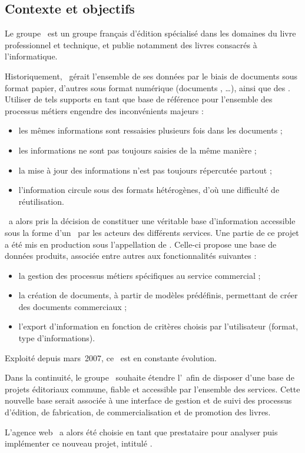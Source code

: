 \subsection{Contexte et objectifs}
\label{section:eyrolles_contexte}

Le groupe \aey\ est un groupe français d'édition spécialisé dans les domaines du livre professionnel et technique, et publie notamment des livres consacrés à l'informatique.

Historiquement, \aey\ gérait l'ensemble de ses données par le biais de documents sous format papier, d'autres sous format numérique (documents \amsword, \amsexcel\dots), ainsi que des \aemails. Utiliser de tels supports en tant que base de référence pour l'ensemble des processus métiers engendre des inconvénients majeurs :

\begin{itemize}
	\item les mêmes informations sont ressaisies plusieurs fois dans les documents ;
	\item les informations ne sont pas toujours saisies de la même manière ;
	\item la mise à jour des informations n'est pas toujours répercutée partout ;
	\item l'information circule sous des formats hétérogènes, d'où une difficulté de réutilisation.
\end{itemize}

\aey\ a alors pris la décision de constituer une véritable base d'information accessible sous la forme d'un \aintranet\ par les acteurs des différents services. Une partie de ce projet a été mis en production sous l'appellation de \emph{\alotun}. Celle-ci propose une base de données produits, associée entre autres aux fonctionnalités suivantes :

\begin{itemize}
	\item la gestion des processus métiers spécifiques au service commercial ;
	\item la création de documents, à partir de modèles prédéfinis, permettant de créer des documents commerciaux ;
	\item l'export d'information en fonction de critères choisis par l'utilisateur (format, type d'informations).
\end{itemize}

Exploité depuis mars~2007, ce \alotun\ est en constante évolution.

Dans la continuité, le groupe \aey\ souhaite étendre l'\aey\ afin de disposer d'une base de projets éditoriaux commune, fiable et accessible par l'ensemble des services. Cette nouvelle base serait associée à une interface de gestion et de suivi des processus d'édition, de fabrication, de commercialisation et de
promotion des livres.

L'agence web \asl\ a alors été choisie en tant que prestataire pour analyser puis implémenter ce nouveau projet, intitulé \emph{\alotdeux}.
